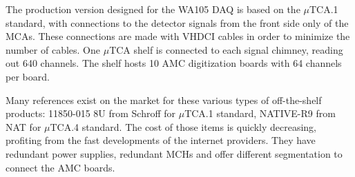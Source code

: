 The production version designed for the WA105 DAQ is based on the
$\mu$TCA.1 standard, with connections to the detector signals from the
front side only of the MCAs. These connections are made with VHDCI
cables in order to minimize the number of cables. One $\mu$TCA shelf
is connected to each signal chimney, reading out 640 channels.  The
shelf hosts 10 AMC digitization boards with 64 channels per board.


Many references exist on the market for these various types of
off-the-shelf products: 11850-015 8U from Schroff for $\mu$TCA.1
standard, NATIVE-R9 from NAT for $\mu$TCA.4 standard. The cost of
those items is quickly decreasing, profiting from the fast
developments of the internet providers. They have redundant power
supplies, redundant MCHs and offer different segmentation to connect
the AMC boards.



